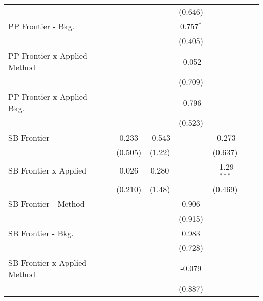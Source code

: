 \begin{tabular}{lcccccc}
                                  &               &              & (0.646)      &               &        &   \\   
   PP Frontier - Bkg.             &               &              & 0.757$^{*}$  &               &        &   \\   
                                  &               &              & (0.405)      &               &        &   \\   
   PP Frontier x Applied - Method &               &              & -0.052       &               &        &   \\   
                                  &               &              & (0.709)      &               &        &   \\   
   PP Frontier x Applied - Bkg.   &               &              & -0.796       &               &        &   \\   
                                  &               &              & (0.523)      &               &        &   \\   
   SB Frontier                    & 0.233         & -0.543       &              & -0.273        &        &   \\   
                                  & (0.505)       & (1.22)       &              & (0.637)       &        &   \\   
   SB Frontier x Applied          & 0.026         & 0.280        &              & -1.29$^{***}$ &        &   \\   
                                  & (0.210)       & (1.48)       &              & (0.469)       &        &   \\   
   SB Frontier - Method           &               &              & 0.906        &               &        &   \\   
                                  &               &              & (0.915)      &               &        &   \\   
   SB Frontier - Bkg.             &               &              & 0.983        &               &        &   \\   
                                  &               &              & (0.728)      &               &        &   \\   
   SB Frontier x Applied - Method &               &              & -0.079       &               &        &   \\   
                                  &               &              & (0.887)      &               &        &   \\   

\end{tabular}
